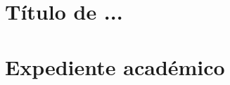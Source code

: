 
\section{Título de ...}

\cleardoublepage


\cleardoublepage
\section{Expediente académico}

\cleardoublepage


